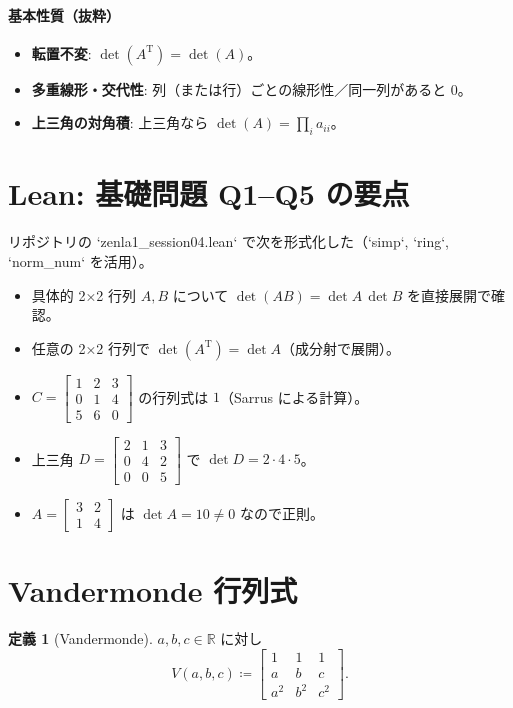 \documentclass[luatexja,ja=standard,a4paper,12pt]{bxjsarticle}
\newcommand{\R}{\mathbb{R}}
\newcommand{\TT}{\mathrm{T}}
\theoremstyle{definition}
\newtheorem{definition}{定義}
\theoremstyle{plain}
\theoremstyle{remark}
\begin{document}
\paragraph{基本性質（抜粋）}
\begin{itemize}
  \item \textbf{転置不変}: $\det(A^{\TT})=\det(A)$。
  \item \textbf{多重線形・交代性}: 列（または行）ごとの線形性／同一列があると 0。
  \item \textbf{上三角の対角積}: 上三角なら $\det(A)=\prod\limits_i a_{ii}$。
\end{itemize}

\section{Lean: 基礎問題 Q1–Q5 の要点}
リポジトリの `zenla1_session04.lean` で次を形式化した（`simp`, `ring`, `norm_num` を活用）。
\begin{itemize}
  \item[Q1] 具体的 2×2 行列 $A,B$ について $\det(AB)=\det A\,\det B$ を直接展開で確認。
  \item[Q2] 任意の 2×2 行列で $\det(A^{\TT})=\det A$（成分射で展開）。
  \item[Q3] $C=\begin{bmatrix}1&2&3\\0&1&4\\5&6&0\end{bmatrix}$ の行列式は $1$（Sarrus による計算）。
  \item[Q4] 上三角 $D=\begin{bmatrix}2&1&3\\0&4&2\\0&0&5\end{bmatrix}$ で $\det D=2\cdot 4\cdot 5$。
  \item[Q5] $A=\begin{bmatrix}3&2\\1&4\end{bmatrix}$ は $\det A=10\ne 0$ なので正則。
\end{itemize}

\section{Vandermonde 行列式}
\begin{definition}[Vandermonde]
\label{def:vand}
$a,b,c\in\R$ に対し
\[
  V(a,b,c)\coloneqq
  \begin{bmatrix}
    1 & 1 & 1\\
    a & b & c\\
    a^2 & b^2 & c^2
  \end{bmatrix}.
\]
\end{definition}
\end{document}
